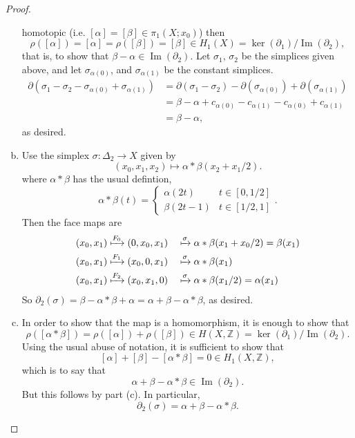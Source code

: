 \documentclass{article}
\newcommand{\fn}[3]{#1 \colon #2 \rightarrow #3}
\DeclareMathOperator{\im}{Im}
\begin{document}
\begin{proof}
\begin{enumerate}[(a)]
    homotopic (i.e. $[\alpha] = [\beta] \in \pi_1(X;x_0)$) then \[
      \rho([\alpha]) = [\alpha] = \rho([\beta]) = [\beta] \in H_1(X)
      = \ker(\partial_1)/\im(\partial_2),
    \] that is, to show that $\beta - \alpha \in \im(\partial_2)$. Let
      $\sigma_1$, $\sigma_2$ be the simplices given above, and let
      $\sigma_{\alpha(0)}$, and $\sigma_{\alpha(1)}$ be the constant simplices.
    \begin{align*}
      \partial(\sigma_1 - \sigma_2 - \sigma_{\alpha(0)} + \sigma_{\alpha(1)})
      &= \partial(\sigma_1 - \sigma_2) - \partial(\sigma_{\alpha(0)}) + \partial(\sigma_{\alpha(1)}) \\
      &= \beta - \alpha + c_{\alpha(0)} - c_{\alpha(1)} - c_{\alpha(0)} + c_{\alpha(1)} \\
      &= \beta - \alpha,
    \end{align*}
    as desired.
    \item Use the simplex $\fn{\sigma}{\Delta_2}{X}$ given by \[
      (x_0, x_1, x_2) \mapsto \alpha * \beta(x_2 + x_1/2).
    \] where $\alpha * \beta$ has the usual defintion, \[
      \alpha * \beta(t) = \begin{cases}
        \alpha(2t) & t \in [0, 1/2] \\
        \beta(2t - 1) & t \in [1/2, 1]
      \end{cases}.
    \]
    Then the face maps are \begin{alignat*}{2}
      (x_0, x_1) &\xmapsto{F_0} (0, x_0, x_1) && \xmapsto{\sigma} \alpha * \beta(x_1 + x_0/2) = \beta(x_1) \\
      (x_0, x_1) &\xmapsto{F_1} (x_0, 0, x_1) && \xmapsto{\sigma} \alpha * \beta(x_1) \\
      (x_0, x_1) &\xmapsto{F_2} (x_0, x_1, 0) && \xmapsto{\sigma} \alpha * \beta(x_1/2) = \alpha(x_1)
    \end{alignat*}
    So $\partial_2(\sigma) = \beta - \alpha * \beta + \alpha = \alpha + \beta - \alpha * \beta$, as desired.
    \item In order to show that the map is a homomorphism,
    it is enough to show that \[
      \rho([\alpha * \beta]) = \rho([\alpha]) + \rho([\beta])
      \in H(X, \mathbb Z) = \ker(\partial_1)/\im(\partial_2).
    \]
    Using the usual abuse of notation, it is sufficient to show that \[
      [\alpha] + [\beta] - [\alpha * \beta] = 0 \in H_1(X, \mathbb Z),
    \] which is to say that \[
      \alpha + \beta - \alpha * \beta \in \im(\partial_2).
    \]
    But this follows by part (c). In particular, \[
      \partial_2(\sigma) = \alpha + \beta - \alpha * \beta.
\]
\end{enumerate}
\end{proof}
\end{document}

